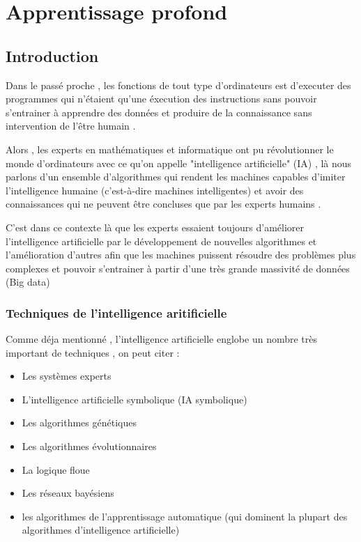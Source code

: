 \chapter{Apprentissage profond}
\section{Introduction}
    Dans le passé proche , les fonctions de tout type d'ordinateurs est d'executer des programmes qui n'étaient qu'une éxecution des instructions sans pouvoir s'entrainer à apprendre des données et produire de la connaissance sans intervention de l'être humain .
    
    Alors , les experts en mathématiques et informatique ont pu révolutionner le monde d'ordinateurs avec ce qu'on appelle "intelligence artificielle" (IA) , là nous parlons d'un ensemble d'algorithmes qui rendent les machines capables d'imiter l'intelligence humaine (c'est-à-dire machines intelligentes) et avoir des connaissances qui ne peuvent être concluses que par les experts humains .
    
    C'est dans ce contexte là que les experts essaient toujours d'améliorer l'intelligence artificielle par le développement de nouvelles algorithmes et l'amélioration d'autres afin que les machines puissent résoudre des problèmes plus complexes et pouvoir s'entrainer à partir d'une très grande massivité de données (Big data)
 
\subsection{Techniques de l'intelligence aritificielle}
    Comme déja mentionné , l'intelligence artificielle englobe un nombre très important de techniques , on peut citer \cite{artificial_intelligence_vs_machine_learning_vs_deep_learning} \cite{asemi2021intelligent} :
    \begin{itemize}[label=$\bullet$]
    \item Les systèmes experts
    \item L'intelligence artificielle symbolique (IA symbolique)
    \item Les algorithmes génétiques
    \item Les algorithmes évolutionnaires 
    \item La logique floue
    \item Les réseaux bayésiens
    \item les algorithmes de l'apprentissage automatique (qui dominent la plupart des algorithmes d'intelligence artificielle) 
    \end{itemize}

